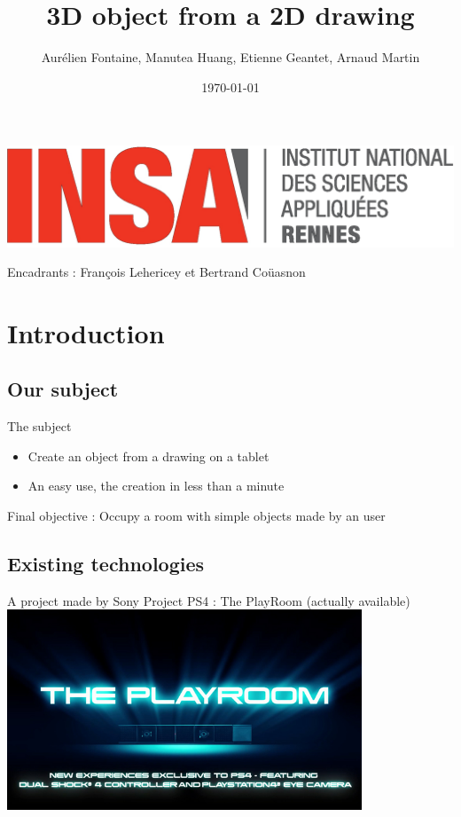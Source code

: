 \documentclass[a4paper,10pt]{beamer}
\title{3D object from a 2D drawing}
\author[Groupe 3INFO]{Aurélien Fontaine, Manutea Huang, Etienne Geantet, Arnaud Martin}
\institute[INSA de Rennes]{Institut National des Sciences Appliquées de Rennes}
\date{\today}
\begin{document}
	\begin{frame}
		\begin{titlepage}
			\centerline{\includegraphics[scale=0.1]{images/logoINSA.jpg}}
			Encadrants : François Lehericey	et Bertrand	Coüasnon	
		\end{titlepage}
	\end{frame}
	
	\begin{frame}
		\tableofcontents
	\end{frame}
	
	\section{Introduction}
	
		\subsection{Our subject}
	
			\begin{frame}{The subject}
				\begin{itemize}
					\item Create an object from a drawing on a tablet
					\item An easy use, the creation in less than a minute
				\end{itemize}
				Final objective : Occupy a room with simple objects made by an user
			\end{frame}
			
		\subsection{Existing technologies}
			
			\begin{frame}{A project made by Sony}
				Project PS4 : The PlayRoom (actually available)
				\href{run:The_PlayRoom.avi}{\includegraphics[width=300pt]{images/The-Playroom.jpg}}
			\end{frame}
			
\end{document}
